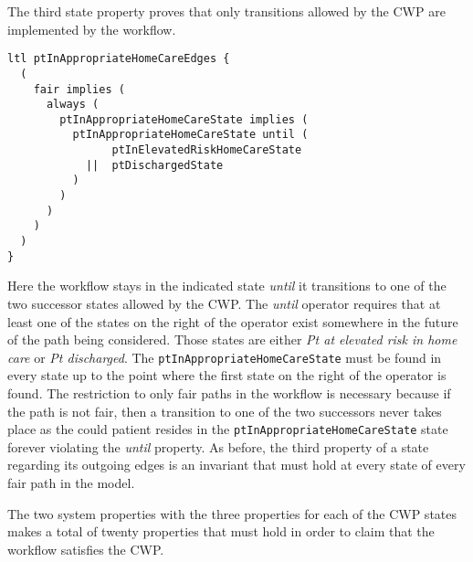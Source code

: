 The third state property proves that only transitions allowed by the CWP are implemented by the workflow.
%
{\small
\begin{lstlisting}[style=myPromela]
ltl ptInAppropriateHomeCareEdges {
  (
    fair implies (
      always (
        ptInAppropriateHomeCareState implies (
          ptInAppropriateHomeCareState until (
                ptInElevatedRiskHomeCareState
            ||  ptDischargedState
          )
        )
      )
    )
  )
}
\end{lstlisting}
}
%
\noindent Here the workflow stays in the indicated state \emph{until} it transitions to one of the two successor states allowed by the CWP. The \emph{until} operator requires that at least one of the states on the right of the operator exist somewhere in the future of the path being considered. Those states are either \emph{Pt at elevated risk in home care} or \emph{Pt discharged}. The \texttt{ptInAppropriateHomeCareState} must be found in every state up to the point where the first state on the right of the operator is found. The restriction to only fair paths in the workflow is necessary because if the path is not fair, then a transition to one of the two successors never takes place as the could patient resides in the \texttt{ptInAppropriateHomeCareState} state forever violating the \emph{until} property. As before, the third property of a state regarding its outgoing edges is an invariant that must hold at every state of every fair path in the model. 

The two system properties with the three properties for each of the CWP states makes a total of twenty properties that must hold in order to claim that the workflow satisfies the CWP.